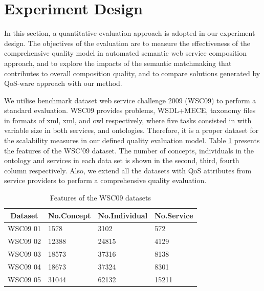 \documentclass{llncs}
\begin{document}
\section{Experiment Design}\label{experiment_design}
In this section, a quantitative evaluation approach is adopted in our experiment design. The objectives of the evaluation are to measure the effectiveness of the comprehensive quality model in automated semantic web service composition approach, and to explore the impacts of the semantic matchmaking that contributes to overall composition quality, and to compare solutions generated by QoS-ware approach with our method.

We utilise benchmark dataset web service challenge 2009 (WSC09) \cite{kona2009wsc} to perform a standard evaluation. WSC09 provides problems,  WSDL+MECE, taxonomy files in formats of xml, xml, and owl respectively, where five tasks consisted in with variable size in both services, and ontologies. Therefore, it is a proper dataset for the scalability measures in our defined quality evaluation model. Table \ref{wsc09datasetTable} presents the features of the WSC’09 dataset. The number of concepts, individuals in the ontology and services in each data set is shown in the second, third, fourth column respectively. Also, we extend all the datasets with QoS attributes from service providers to perform a comprehensive quality evaluation. 
\begin{table}[]
\centering
\caption{Features of the WSC09 datasets}
\label{wsc09datasetTable}
\begin{tabular}{|l|l|l|l|}
\hline
\multicolumn{1}{|c|}{Dataset} & No.Concept & No.Individual & No.Service \\ \hline
WSC09 01                     & 1578       &3102           &572      \\ \hline
WSC09 02                     & 12388      &24815          &4129      \\ \hline
WSC09 03                     & 18573      &37316          &8138      \\ \hline
WSC09 04                     & 18673      &37324          &8301      \\ \hline
WSC09 05                     & 31044      &62132          &15211    \\ \hline
\end{tabular}
\end{table}
\end{document}
